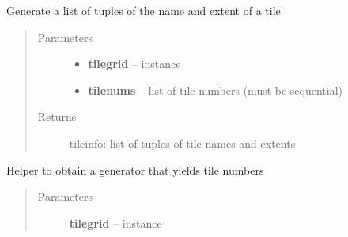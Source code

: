 \documentclass[letterpaper,10pt,english]{sphinxmanual}
\begin{document}

\begin{fulllineitems}
\label{docs/all_multipliers:all_multipliers.get_tileinfo}
Generate a list of tuples of the name and extent of a tile
\begin{quote}\begin{description}
\item[{Parameters}] \leavevmode\begin{itemize}
\item {} 
\textbf{tilegrid} -- {\hyperref[docs/all_multipliers:all_multipliers.TileGrid]{}} instance

\item {} 
\textbf{tilenums} -- list of tile numbers (must be sequential)

\end{itemize}

\item[{Returns}] \leavevmode
tileinfo: list of tuples of tile names and extents

\end{description}\end{quote}

\end{fulllineitems}



\begin{fulllineitems}
\label{docs/all_multipliers:all_multipliers.get_tiles}
Helper to obtain a generator that yields tile numbers
\begin{quote}\begin{description}
\item[{Parameters}] \leavevmode
\textbf{tilegrid} -- {\hyperref[docs/all_multipliers:all_multipliers.TileGrid]{}} instance

\end{description}\end{quote}

\end{fulllineitems}


\end{document}
